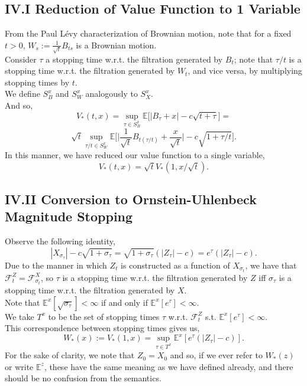 \documentclass[12pt]{article}
\newcommand{\cF}{\mathcal{F}}
\newcommand{\E}{\mathbb{E}}
\theoremstyle{definition}
\begin{document}
\subsection*{IV.I Reduction of Value Function to 1 Variable}\label{sec:IV.I}
From the Paul Lévy characterization of Brownian motion, note that for a fixed $t > 0$, $W_s := \frac{1}{\sqrt{t}} B_{ts}$ is a Brownian motion. \\
Consider $\tau$ a stopping time w.r.t. the filtration generated by $B_t$; note that $\tau/t$ is a stopping time w.r.t. the filtration generated by $W_t$, and vice versa, by multiplying stopping times by $t$. \\
We define $S^x_B$ and $S^x_W$ analogously to $S^x_X$. \\
And so,
\[
    V_*(t, x) = \sup_{\tau \in S^x_B} \E \Big [ |B_\tau + x| - c \sqrt{t + \tau} \Big ] =
\]
\[
    \sqrt{t} \sup_{\tau/t \in S^x_W} \E \bigg [ \Big | \frac{1}{\sqrt{t}} B_{t (\tau/t)} + \frac{x}{\sqrt{t}} \Big | - c \sqrt{1 + \tau/t} \bigg ].
\]
In this manner, we have reduced our value function to a single variable,
\[
    V_*(t, x) = \sqrt{t} V_*(1, x/\sqrt{t}).
\]
\subsection*{IV.II Conversion to Ornstein-Uhlenbeck Magnitude Stopping}\label{sec:IV.II}
Observe the following identity,
\[
    |X_{\sigma_\tau}| - c \sqrt{1 + \sigma_\tau} = \sqrt{1 + \sigma_\tau} (|Z_\tau| - c) = e^\tau (|Z_\tau| - c).
\]
Due to the manner in which $Z_t$ is constructed as a function of $X_{\sigma_t}$, we have that $\cF^Z_t = \cF^X_{\sigma_t}$, so $\tau$ is a stopping time w.r.t. the filtration generated by $Z$ iff $\sigma_\tau$ is a stopping time w.r.t. the filtration generated by $X$. \\
Note that $\E^x[\sqrt{\sigma_\tau}] < \infty$ if and only if $\E^x[ e^\tau ] < \infty$. \\
We take $T^x$ to be the set of stopping times $\tau$ w.r.t. $\cF^Z_t$ s.t. $\E^x[e^\tau] < \infty$. \\
This correspondence between stopping times gives us,
\[
    W_*(x) := V_*(1, x) =
    \sup_{\tau \in T^x} \E^x [e^\tau (|Z_\tau |- c) ].
\]
For the sake of clarity, we note that $Z_0 = X_0$ and so, if we ever refer to $W_*(z)$ or write $\E^z$, these have the same meaning as we have defined already, and there should be no confusion from the semantics. \\
\end{document}
